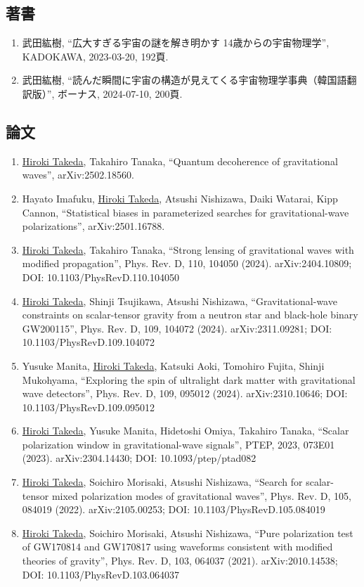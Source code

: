\documentclass[uplatex, 11pt]{jsarticle}
\begin{document}
\subsection*{著書}
\begin{enumerate}
\item 武田紘樹, “広大すぎる宇宙の謎を解き明かす 14歳からの宇宙物理学”, KADOKAWA, 2023-03-20, 192頁.
\item 武田紘樹, “読んだ瞬間に宇宙の構造が見えてくる宇宙物理学事典（韓国語翻訳版）”, ボーナス, 2024-07-10, 200頁.
\end{enumerate}
\subsection*{論文}
\begin{enumerate}
\item \uline{Hiroki Takeda}, Takahiro Tanaka, “Quantum decoherence of gravitational waves”, arXiv:2502.18560.
\item Hayato Imafuku, \uline{Hiroki Takeda}, Atsushi Nishizawa, Daiki Watarai, Kipp Cannon, “Statistical biases in parameterized searches for gravitational-wave polarizations”, arXiv:2501.16788.
\item \uline{Hiroki Takeda}, Takahiro Tanaka, “Strong lensing of gravitational waves with modified propagation”, Phys. Rev. D, 110, 104050 (2024). arXiv:2404.10809; DOI: 10.1103/PhysRevD.110.104050
\item \uline{Hiroki Takeda}, Shinji Tsujikawa, Atsushi Nishizawa, “Gravitational-wave constraints on scalar-tensor gravity from a neutron star and black-hole binary GW200115”, Phys. Rev. D, 109, 104072 (2024). arXiv:2311.09281; DOI: 10.1103/PhysRevD.109.104072
\item Yusuke Manita, \uline{Hiroki Takeda}, Katsuki Aoki, Tomohiro Fujita, Shinji Mukohyama, “Exploring the spin of ultralight dark matter with gravitational wave detectors”, Phys. Rev. D, 109, 095012 (2024). arXiv:2310.10646; DOI: 10.1103/PhysRevD.109.095012
\item \uline{Hiroki Takeda}, Yusuke Manita, Hidetoshi Omiya, Takahiro Tanaka, “Scalar polarization window in gravitational-wave signals”, PTEP, 2023, 073E01 (2023). arXiv:2304.14430; DOI: 10.1093/ptep/ptad082
\item \uline{Hiroki Takeda}, Soichiro Morisaki, Atsushi Nishizawa, “Search for scalar-tensor mixed polarization modes of gravitational waves”, Phys. Rev. D, 105, 084019 (2022). arXiv:2105.00253; DOI: 10.1103/PhysRevD.105.084019
\item \uline{Hiroki Takeda}, Soichiro Morisaki, Atsushi Nishizawa, “Pure polarization test of GW170814 and GW170817 using waveforms consistent with modified theories of gravity”, Phys. Rev. D, 103, 064037 (2021). arXiv:2010.14538; DOI: 10.1103/PhysRevD.103.064037

\end{enumerate}
\end{document}

